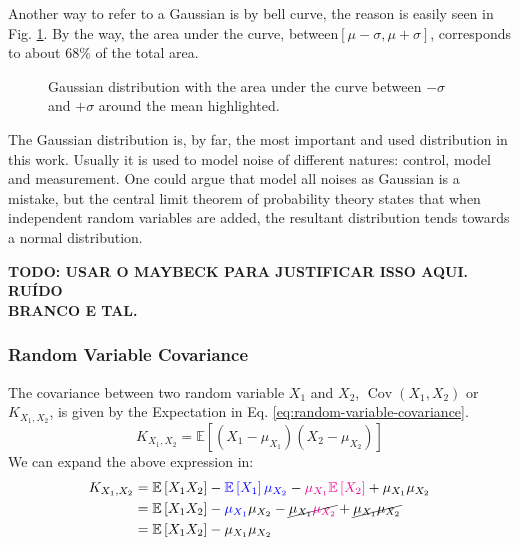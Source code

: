 \documentclass[12pt]{article}
\newcommand{\brac}[1]{\left[#1\right]} %
\newcommand{\parentheses}[1]{\left(#1\right)}
\newcommand{\cov}[1]{\mathop{Cov}\parentheses{#1}}
\newcommand{\expv}[1]{\mathbb{E}\brac{#1}} %
\newcommand{\blue}[1]{\color{blue}#1\color{black}}
\newcommand{\magenta}[1]{\color{magenta}#1\color{black}}
\begin{document}
Another way to refer to a Gaussian is by bell curve, the reason is easily seen in Fig. \ref{fig:guassian-curve}. By the way, the area under the curve, between$\left[\mu-\sigma, \mu+\sigma\right]$, corresponds to about $68\%$ of the total area.

\begin{figure}[h]
    \centering
    
    \caption{Gaussian distribution with the area under the curve between $-\sigma$ and $+\sigma$ around the mean highlighted.}
    \label{fig:guassian-curve}
\end{figure}

The Gaussian distribution is, by far, the most important and used distribution in this work. Usually it is used to model noise of different natures: control, model and measurement. One could argue that model all noises as Gaussian is a mistake, but the central limit theorem of probability theory states that when independent random variables are added, the resultant distribution tends towards a normal distribution.

\color{magenta}
\textbf{TODO: USAR O MAYBECK PARA JUSTIFICAR ISSO AQUI. RUÍDO \\BRANCO E TAL.}
\color{black}

\subsubsection{Random Variable Covariance}
The covariance between two random variable $X_1$ and $X_2$, $\cov{X_1, X_2}$ or $K_{X_1, X_2}$, is given by the Expectation in Eq. \ref{eq:random-variable-covariance}.
\begin{equation}
    K_{X_1, X_2} = \expv{(X_1 - \mu_{X_1})(X_2 - \mu_{X_2})}
    \label{eq:random-variable-covariance}
\end{equation}
We can expand the above expression in:
\begin{equation}
\begin{aligned}
    K_{X_1, X_2} &= \expv{X_1 X_2} - \blue{\expv{X_1}\mu_{X_2}} - \magenta{\mu_{X_1}\expv{X_2}} + \mu_{X_1} \mu_{X_2}\\
    &= \expv{X_1 X_2} - \blue{\mu_{X_1}}\mu_{X_2} - \cancel{\mu_{X_1}\magenta{\mu_{X_2}}} + \cancel{\mu_{X_1} \mu_{X_2}}\\
    &= \expv{X_1 X_2} - \mu_{X_1}\mu_{X_2}
\end{aligned}
    \label{eq:random-variable-covariance-expanded}
\end{equation}
\end{document}
